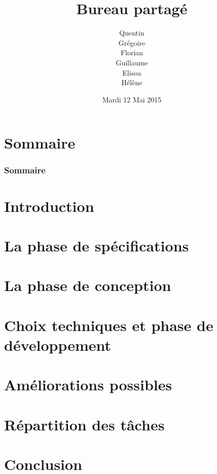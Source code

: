 \documentclass[11pt, handout]{beamer}
\title[Bureau partagé]{Bureau partagé}
\author{Quentin \bsc{Diaferia} \\ 
        Grégoire \bsc{Gutzwiller} \\ 
        Florian \bsc{Lepetit} \\ 
        Guillaume \bsc{Minette de Saint-Martin} \\ 
        Elisoa \bsc{Ramarokoto} \\ 
        Hélène \bsc{Soudry}}
\date[12/05/2015]{Mardi 12 Mai 2015}
\begin{document}
\begin{frame}[plain]
	\maketitle
\end{frame}


\section*{Sommaire}
\begin{frame}
	\frametitle{Sommaire}
	\tableofcontents
\end{frame}

\section{Introduction}


\section{La phase de spécifications}


\section{La phase de conception}


\section{Choix techniques et phase de développement}


\section{Améliorations possibles}


\section{Répartition des tâches}


\section{Conclusion}

\end{document}
